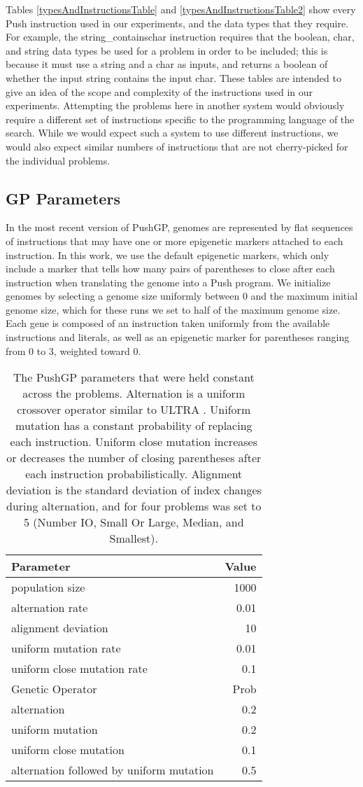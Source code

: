 \documentclass{sig-alternate}
\begin{document}
Tables \ref{typesAndInstructionsTable} and \ref{typesAndInstructionsTable2} show every Push instruction used in our experiments, and the data types that they require. For example, the string\_containschar instruction requires that the boolean, char, and string data types be used for a problem in order to be included; this is because it must use a string and a char as inputs, and returns a boolean of whether the input string contains the input char. These tables are intended to give an idea of the scope and complexity of the instructions used in our experiments. Attempting the problems here in another system would obviously require a different set of instructions specific to the programming language of the search. While we would expect such a system to use different instructions, we would also expect similar numbers of instructions that are not cherry-picked for the individual problems.


\subsection{GP Parameters}


In the most recent version of PushGP, genomes are represented by flat sequences of instructions that may have one or more epigenetic markers attached to each instruction. In this work, we use the default epigenetic markers, which only include a marker that tells how many pairs of parentheses to close after each instruction when translating the genome into a Push program. We initialize genomes by selecting a genome size uniformly between 0 and the maximum initial genome size, which for these runs we set to half of the maximum genome size. Each gene is composed of an instruction taken uniformly from the available instructions and literals, as well as an epigenetic marker for parentheses ranging from 0 to 3, weighted toward 0.

\begin{table}%
\centering
\caption{The PushGP parameters that were held constant across the problems. Alternation is a uniform crossover operator similar to ULTRA \cite{spector:2014:GPTP}. Uniform mutation has a constant probability of replacing each instruction. Uniform close mutation increases or decreases the number of closing parentheses after each instruction probabilistically. Alignment deviation is the standard deviation of index changes during alternation, and for four problems was set to 5 (Number IO, Small Or Large, Median, and Smallest).}
\label{tableGPconstantParams}
\begin{tabular}{l r}
\toprule
Parameter & Value \tabularnewline
\midrule
population size & 1000 \tabularnewline
alternation rate & 0.01 \tabularnewline
alignment deviation & 10 \tabularnewline
uniform mutation rate & 0.01 \tabularnewline
uniform close mutation rate & 0.1 \tabularnewline
\midrule
Genetic Operator & Prob \tabularnewline
\midrule
alternation & 0.2 \tabularnewline
uniform mutation & 0.2 \tabularnewline
uniform close mutation & 0.1 \tabularnewline
alternation followed by uniform mutation & 0.5 \tabularnewline
\bottomrule
\end{tabular}
\end{table}
\end{document}

